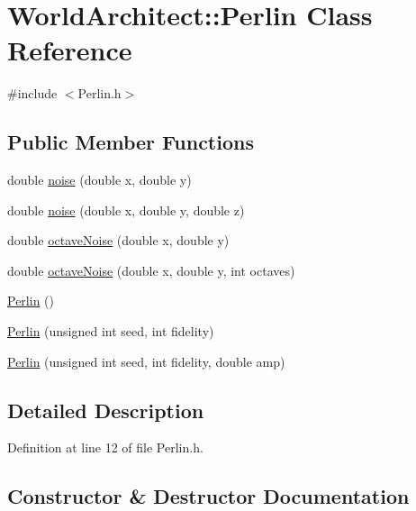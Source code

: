 \hypertarget{class_world_architect_1_1_perlin}{}\section{World\+Architect\+::Perlin Class Reference}
\label{class_world_architect_1_1_perlin}


{\ttfamily \#include $<$Perlin.\+h$>$}

\subsection*{Public Member Functions}
\begin{DoxyCompactItemize}
\item 
double \mbox{\hyperlink{class_world_architect_1_1_perlin_a291f72bb34ee1cbbb17997c05a9e212a}{noise}} (double x, double y)
\item 
double \mbox{\hyperlink{class_world_architect_1_1_perlin_a2036993a6444693cf37dbde7dcdf023c}{noise}} (double x, double y, double z)
\item 
double \mbox{\hyperlink{class_world_architect_1_1_perlin_a6c2d998b0d2c191b1366f91271c00249}{octave\+Noise}} (double x, double y)
\item 
double \mbox{\hyperlink{class_world_architect_1_1_perlin_ac3dd81a7e37765c1ec13930cce207d56}{octave\+Noise}} (double x, double y, int octaves)
\item 
\mbox{\hyperlink{class_world_architect_1_1_perlin_af435cbd994560e90e5707fe841e3d2e1}{Perlin}} ()
\item 
\mbox{\hyperlink{class_world_architect_1_1_perlin_acacc541afc0af0ff3bda471f0d1988e9}{Perlin}} (unsigned int seed, int fidelity)
\item 
\mbox{\hyperlink{class_world_architect_1_1_perlin_a683bfd35029115218bb2f775f373e7a0}{Perlin}} (unsigned int seed, int fidelity, double amp)
\end{DoxyCompactItemize}


\subsection{Detailed Description}


Definition at line 12 of file Perlin.\+h.



\subsection{Constructor \& Destructor Documentation}
\mbox{\label{class_world_architect_1_1_perlin_af435cbd994560e90e5707fe841e3d2e1}} 
